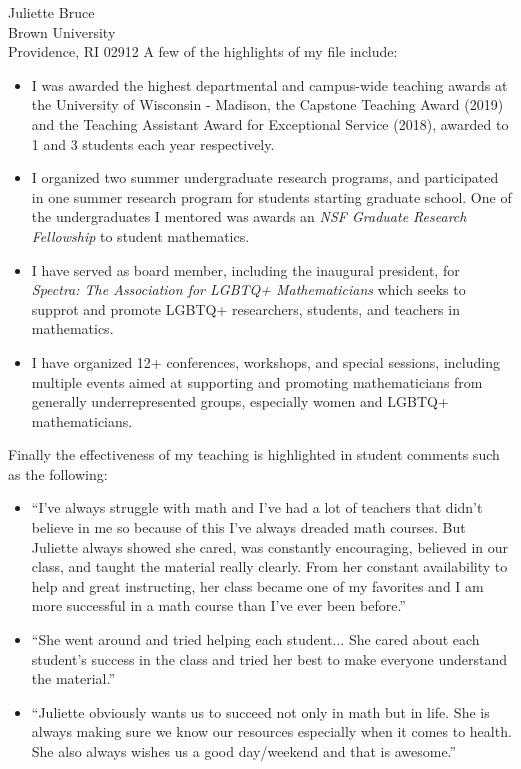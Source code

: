\documentclass[11pt]{brownletter}
\begin{document}
\begin{letter}{Juliette Bruce\\ 
               Brown University\\ 
               Providence, RI 02912}
A few of the highlights of my file include:

\begin{itemize}[leftmargin=*]
\item I was awarded the highest departmental and campus-wide teaching awards at the University of Wisconsin - Madison, the Capstone Teaching Award (2019) and the Teaching Assistant Award for Exceptional Service (2018), awarded to 1 and 3 students each year respectively. 
\item I organized two summer undergraduate research programs, and participated in one summer research program for students starting graduate school. One of the undergraduates I mentored was awards an \textit{NSF Graduate Research Fellowship} to student mathematics.  
\item I have served as board member, including the inaugural president, for \textit{Spectra: The Association for LGBTQ+ Mathematicians} which seeks to supprot and promote LGBTQ+ researchers, students, and teachers in mathematics. 
\item I have organized 12+ conferences, workshops, and special sessions, including multiple events aimed at supporting and promoting mathematicians from generally underrepresented groups, especially women and LGBTQ+ mathematicians. 
\end{itemize}

Finally the effectiveness of my teaching is highlighted in student comments such as the following:
\begin{itemize}[leftmargin=*]
\item ``I’ve always struggle with math and I’ve had a lot of teachers that didn’t believe in me so because of this I’ve always dreaded math courses. But Juliette always showed she cared, was constantly encouraging, believed in our class, and taught the material really clearly. From her constant availability to help and great instructing, her class became one of my favorites and I am more successful in a math course than I’ve ever been before.''
\item ``She went around and tried helping each student... She cared about each student’s success in the class and tried her best to make everyone understand the material.''
\item ``Juliette obviously wants us to succeed not only in math but in life. She is always making sure we know our resources especially when it comes to health. She also always wishes us a good day/weekend and that is awesome.''
\end{itemize}


\end{letter}
\end{document}
